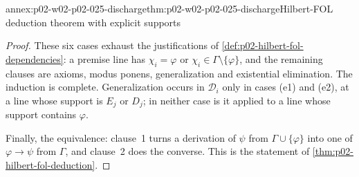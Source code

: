\begin{annexitem}{annex:p02-w02-p02-025-discharge}{thm:p02-w02-p02-025-discharge}{Hilbert-FOL deduction theorem with explicit supports}
\begin{proof}
These six cases exhaust the justifications of
\cref{def:p02-hilbert-fol-dependencies}: a premise line has \(\chi_i=\varphi\)
or \(\chi_i\in\Gamma\setminus\{\varphi\}\), and the remaining clauses are
axioms, modus ponens, generalization and existential elimination.  The
induction is complete.  Generalization occurs in \(\mathcal D_i\) only in
cases (e1) and (e2), at a line whose support is \(E_j\) or \(D_j\); in
neither case is it applied to a line whose support contains \(\varphi\).

Finally, the equivalence: clause~1 turns a derivation of \(\psi\) from
\(\Gamma\cup\{\varphi\}\) into one of \(\varphi\to\psi\) from \(\Gamma\), and
clause~2 does the converse.  This is the statement of
\cref{thm:p02-hilbert-fol-deduction}.
\end{proof}
\end{annexitem}

